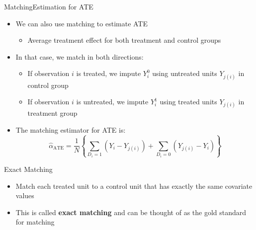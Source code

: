 \documentclass[hyperref={pdfpagelabels=false}]{beamer}
\begin{document}
\begin{frame}{Matching}{Estimation for ATE}
\begin{itemize}
\item We can also use matching to estimate ATE 
\vspace{0.2cm}
	\begin{itemize}
	\item Average treatment effect for both treatment and control groups
	\vspace{0.2cm}
\end{itemize}

\item In that case, we match in both directions:
\vspace{0.2cm}
\begin{itemize}
\item[1.] If observation $i$ is treated, we impute $Y^{0}_{i}$ using untreated units $Y_{j(i)}$ in control group
\vspace{0.2cm}
\item[2.] If observation $i$ is untreated, we impute $Y^{1}_{i}$ using treated units $Y_{j(i)}$ in treatment group
\end{itemize}
\vspace{0.2cm}
\item The matching estimator for ATE is:
	\begin{equation*}
	\hat{\alpha}_{\text{ATE}}=\dfrac{1}{N}\left\lbrace \sum_{D_i=1}(Y_i-Y_{j(i)})+\sum_{D_i=0}(Y_{j(i)}-Y_i)\right\rbrace
	\end{equation*}
\end{itemize}
\end{frame}





\begin{frame}{Exact Matching}{}
	\begin{itemize}
		
		\item Match each treated unit to a control unit that has exactly the same covariate
		values
		\vspace{0.2cm}	
		\item This is called \textbf{exact matching} and can be thought of as the gold standard for
		matching
	
		
		
	\end{itemize}
\end{frame}
\end{document}
